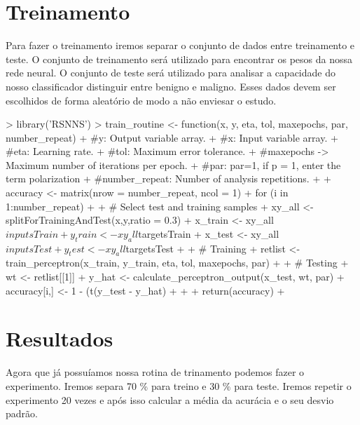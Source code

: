 \documentclass[12pt]{article}
\begin{document}
\section{Treinamento}

  \par Para fazer o treinamento iremos separar o conjunto de dados entre treinamento e teste. O conjunto de treinamento será utilizado para encontrar os pesos da nossa rede neural. O conjunto de teste será utilizado para analisar a capacidade do nosso classificador distinguir entre benigno e maligno. Esses dados devem ser escolhidos de forma aleatório de modo a não enviesar o estudo.
  
\begin{Schunk}
\begin{Sinput}
> library('RSNNS')
> train_routine <- function(x, y, eta, tol, maxepochs, par, number_repeat){
+   #y: Output variable array. 
+   #x: Input variable array.
+   #eta: Learning rate.
+   #tol: Maximum error tolerance.
+   #maxepochs -> Maximum number of iterations per epoch.
+   #par: par=1, if p = 1, enter the term polarization
+   #number_repeat: Number of analysis repetitions.
+   
+ accuracy <- matrix(nrow = number_repeat, ncol = 1)
+ for (i in 1:number_repeat)
+ {
+   # Select test and training samples
+   xy_all <- splitForTrainingAndTest(x,y,ratio = 0.3)
+   x_train <- xy_all$inputsTrain
+   y_train <- xy_all$targetsTrain
+   x_test <- xy_all$inputsTest
+   y_test <- xy_all$targetsTest
+   
+   # Training
+   retlist <- train_perceptron(x_train, y_train, eta, tol, maxepochs, par)
+   
+   # Testing
+   wt <- retlist[[1]]
+   y_hat <- calculate_perceptron_output(x_test, wt, par)
+   accuracy[i,] <- 1 - (t(y_test - y_hat) %*% (y_test - y_hat))/length(y_test)
+ }
+   
+ return(accuracy)
+ }
\end{Sinput}
\end{Schunk}

\section{Resultados}
  \par Agora que já possuíamos nossa rotina de trinamento podemos fazer o experimento. Iremos separa 70 \% para treino e 30 \% para teste. Iremos repetir o experimento 20 vezes e após isso calcular a média da acurácia e o seu desvio padrão.
  
\end{document}
